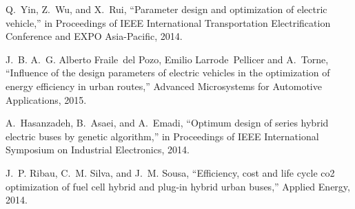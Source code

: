 Q.~Yin, Z.~Wu, and X.~Rui, ``Parameter design and optimization of electric
  vehicle,'' in Proceedings of IEEE International Transportation
  Electrification Conference and EXPO Asia-Pacific, 2014.

J.~B. A.~G. Alberto Fraile~del Pozo, Emilio Larrode~Pellicer and A.~Torne,
  ``Influence of the design parameters of electric vehicles in the optimization
  of energy efficiency in urban routes,'' Advanced Microsystems for
  Automotive Applications, 2015.

A.~Hasanzadeh, B.~Asaei, and A.~Emadi, ``Optimum design of series hybrid
  electric buses by genetic algorithm,'' in Proceedings of IEEE
  International Symposium on Industrial Electronics, 2014.

J.~P. Ribau, C.~M. Silva, and J.~M. Sousa, ``Efficiency, cost and life cycle
  co2 optimization of fuel cell hybrid and plug-in hybrid urban buses,''
  Applied Energy, 2014.
  

